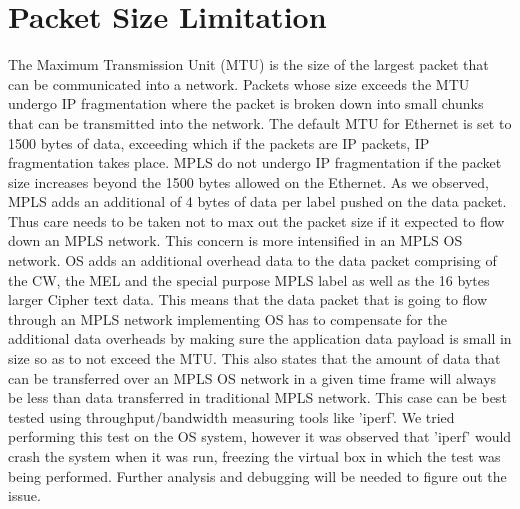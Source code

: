 \section{Packet Size Limitation}
The Maximum Transmission Unit (MTU) is the size of the largest packet that can be communicated into a network. Packets whose size exceeds the MTU undergo IP fragmentation where the packet is broken down into small chunks that can be transmitted into the network. The default MTU for Ethernet is set to 1500 bytes of data, exceeding which if the packets are IP packets, IP fragmentation takes place.
	MPLS do not undergo IP fragmentation if the packet size increases beyond the 1500 bytes allowed on the Ethernet. As we observed, MPLS adds an additional of 4 bytes of data per label pushed on the data packet. Thus care needs to be taken not to max out the packet size if it expected to flow down an MPLS network.
    This concern is more intensified in an MPLS OS network. OS adds an additional overhead data to the data packet comprising of the CW, the MEL and the special purpose MPLS label as well as the 16 bytes larger Cipher text data. This means that the data packet that is going to flow through an MPLS network implementing OS has to compensate for the additional data overheads by making sure the application data payload is small in size so as to not exceed the MTU.
    This also states that the amount of data that can be transferred over an MPLS OS network in a given time frame will always be less than data transferred in traditional MPLS network. This case can be best tested using throughput/bandwidth measuring tools like 'iperf'. We tried performing this test on the OS system, however it was observed that 'iperf' would crash the system when it was run, freezing the virtual box in which the test was being performed. Further analysis and debugging will be needed to figure out the issue.


